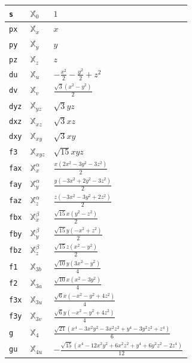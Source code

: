 \documentclass[fleqn,9pt,landscape]{jsarticle}
\begin{document}
\begin{longtable}{lll}
\texttt{s} & $\mathbb{X}_{0}^{}$ & $1$ \\ \hline
\texttt{px} & $\mathbb{X}_{x}^{}$ & $x$ \\
\texttt{py} & $\mathbb{X}_{y}^{}$ & $y$ \\
\texttt{pz} & $\mathbb{X}_{z}^{}$ & $z$ \\ \hline
\texttt{du} & $\mathbb{X}_{u}^{}$ & $- \frac{x^{2}}{2} - \frac{y^{2}}{2} + z^{2}$ \\
\texttt{dv} & $\mathbb{X}_{v}^{}$ & $\frac{\sqrt{3} \left(x^{2} - y^{2}\right)}{2}$ \\
\texttt{dyz} & $\mathbb{X}_{yz}^{}$ & $\sqrt{3} y z$ \\
\texttt{dxz} & $\mathbb{X}_{xz}^{}$ & $\sqrt{3} x z$ \\
\texttt{dxy} & $\mathbb{X}_{xy}^{}$ & $\sqrt{3} x y$ \\ \hline
\texttt{f3} & $\mathbb{X}_{xyz}^{}$ & $\sqrt{15} x y z$ \\
\texttt{fax} & $\mathbb{X}_{x}^{\alpha}$ & $\frac{x \left(2 x^{2} - 3 y^{2} - 3 z^{2}\right)}{2}$ \\
\texttt{fay} & $\mathbb{X}_{y}^{\alpha}$ & $\frac{y \left(- 3 x^{2} + 2 y^{2} - 3 z^{2}\right)}{2}$ \\
\texttt{faz} & $\mathbb{X}_{z}^{\alpha}$ & $\frac{z \left(- 3 x^{2} - 3 y^{2} + 2 z^{2}\right)}{2}$ \\
\texttt{fbx} & $\mathbb{X}_{x}^{\beta}$ & $\frac{\sqrt{15} x \left(y^{2} - z^{2}\right)}{2}$ \\
\texttt{fby} & $\mathbb{X}_{y}^{\beta}$ & $\frac{\sqrt{15} y \left(- x^{2} + z^{2}\right)}{2}$ \\
\texttt{fbz} & $\mathbb{X}_{z}^{\beta}$ & $\frac{\sqrt{15} z \left(x^{2} - y^{2}\right)}{2}$ \\
\texttt{f1} & $\mathbb{X}_{3b}^{}$ & $\frac{\sqrt{10} y \left(3 x^{2} - y^{2}\right)}{4}$ \\
\texttt{f2} & $\mathbb{X}_{3a}^{}$ & $\frac{\sqrt{10} x \left(x^{2} - 3 y^{2}\right)}{4}$ \\
\texttt{f3x} & $\mathbb{X}_{3u}^{}$ & $\frac{\sqrt{6} x \left(- x^{2} - y^{2} + 4 z^{2}\right)}{4}$ \\
\texttt{f3y} & $\mathbb{X}_{3v}^{}$ & $\frac{\sqrt{6} y \left(- x^{2} - y^{2} + 4 z^{2}\right)}{4}$ \\ \hline
\texttt{g} & $\mathbb{X}_{4}^{}$ & $\frac{\sqrt{21} \left(x^{4} - 3 x^{2} y^{2} - 3 x^{2} z^{2} + y^{4} - 3 y^{2} z^{2} + z^{4}\right)}{6}$ \\
\texttt{gu} & $\mathbb{X}_{4u}^{}$ & $- \frac{\sqrt{15} \left(x^{4} - 12 x^{2} y^{2} + 6 x^{2} z^{2} + y^{4} + 6 y^{2} z^{2} - 2 z^{4}\right)}{12}$ \\

\end{longtable}
\end{document}
